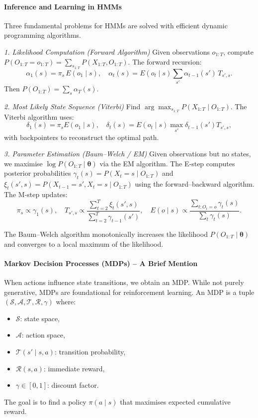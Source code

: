 \documentclass{tufte-handout}
\begin{document}
\paragraph{Inference and Learning in HMMs}
Three fundamental problems for HMMs are solved with efficient dynamic programming algorithms.

\emph{1. Likelihood Computation (Forward Algorithm)}
Given observations $o_{1:T}$, compute $P(O_{1:T}=o_{1:T}) = \sum_{s_{1:T}} P(X_{1:T}, O_{1:T})$. The forward recursion:
\[
\alpha_1(s) = \pi_s \, E(o_1 \mid s), \quad
\alpha_t(s) = E(o_t \mid s) \sum_{s'} \alpha_{t-1}(s') \, T_{s', s}.
\]
Then $P(O_{1:T}) = \sum_s \alpha_T(s)$.

\emph{2. Most Likely State Sequence (Viterbi)}
Find $\arg\max_{s_{1:T}} P(X_{1:T} \mid O_{1:T})$. The Viterbi algorithm uses:
\[
\delta_1(s) = \pi_s E(o_1 \mid s),\quad
\delta_t(s) = E(o_t \mid s) \max_{s'} \delta_{t-1}(s') T_{s', s},
\]
with backpointers to reconstruct the optimal path.

\emph{3. Parameter Estimation (Baum–Welch / EM)}
Given observations but no states, we maximise $\log P(O_{1:T} \mid \boldsymbol{\theta})$ via the EM algorithm. The E‑step computes posterior probabilities $\gamma_t(s) = P(X_t=s \mid O_{1:T})$ and $\xi_t(s',s) = P(X_{t-1}=s', X_t=s \mid O_{1:T})$ using the forward–backward algorithm. The M‑step updates:
\[
\pi_s \propto \gamma_1(s),\quad T_{s',s} \propto \frac{\sum_{t=2}^T \xi_t(s',s)}{\sum_{t=2}^T \gamma_{t-1}(s')},\quad
E(o \mid s) \propto \frac{\sum_{t: O_t=o} \gamma_t(s)}{\sum_t \gamma_t(s)}.
\]

\begin{thm}
    The Baum–Welch algorithm monotonically increases the likelihood $P(O_{1:T} \mid \boldsymbol{\theta})$ and converges to a local maximum of the likelihood.
\end{thm}

\paragraph{Markov Decision Processes (MDPs) – A Brief Mention}
When actions influence state transitions, we obtain an MDP. While not purely generative, MDPs are foundational for reinforcement learning. An MDP is a tuple $(\mathcal{S}, \mathcal{A}, \mathcal{T}, \mathcal{R}, \gamma)$ where:
\begin{itemize}
    \item $\mathcal{S}$: state space,
    \item $\mathcal{A}$: action space,
    \item $\mathcal{T}(s' \mid s, a)$: transition probability,
    \item $\mathcal{R}(s,a)$: immediate reward,
    \item $\gamma \in [0,1]$: discount factor.
\end{itemize}
The goal is to find a policy $\pi(a \mid s)$ that maximises expected cumulative reward.
\end{document}
